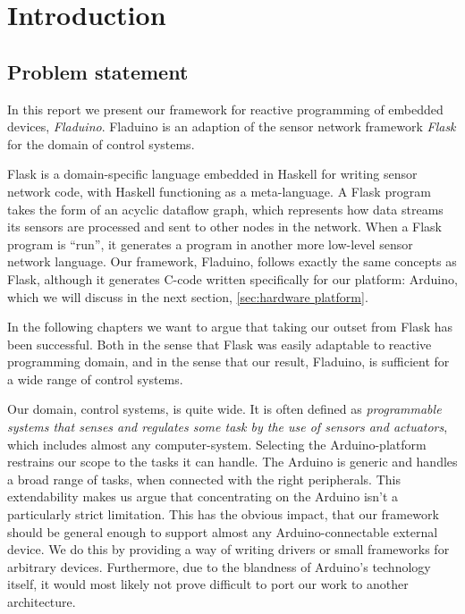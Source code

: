 \documentclass[a4paper, oneside, final]{memoir}
\begin{document}



\mainmatter

\chapter{Introduction}

\section{Problem statement}
In this report we present our framework for reactive programming of
embedded devices, \textit{Fladuino}. Fladuino is an adaption of the
sensor network framework \textit{Flask} for the domain of control
systems.

Flask is a domain-specific language embedded in Haskell for writing
sensor network code, with Haskell functioning as a meta-language. A
Flask program takes the form of an acyclic dataflow graph, which
represents how data streams its sensors are processed and sent to
other nodes in the network. When a Flask program is ``run'', it
generates a program in another more low-level sensor network
language. Our framework, Fladuino, follows exactly the same concepts
as Flask, although it generates C-code written specifically for our
platform: Arduino, which we will discuss in the next section,
\ref{sec:hardware platform}.

In the following chapters we want to argue that taking our outset from
Flask has been successful. Both in the sense that Flask was easily
adaptable to reactive programming domain, and in the sense that our
result, Fladuino, is sufficient for a wide range of control systems.

Our domain, control systems, is quite wide. It is
often defined as \textit{programmable systems
  that senses and regulates some task by the use of sensors and
  actuators}, which includes almost any computer-system. Selecting the
Arduino-platform restrains our scope to the tasks it can handle. The
Arduino is generic and handles a broad range of tasks, when connected
with the right peripherals. This extendability makes us argue that
concentrating on the Arduino isn't a particularly strict
limitation. This has the obvious impact, that our framework should be
general enough to support almost any Arduino-connectable external
device. We do this by providing a way of writing drivers or small
frameworks for arbitrary devices.  Furthermore, due to the blandness
of Arduino's technology itself, it would most likely not prove
difficult to port our work to another architecture.
\end{document}

